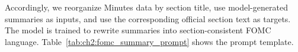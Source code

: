 Accordingly, we reorganize Minutes data by section title, use model-generated summaries as inputs, and use the corresponding official section text as targets. The model is trained to rewrite summaries into section-consistent FOMC language. Table~\ref{tab:ch2:fomc_summary_prompt} shows the prompt template.


